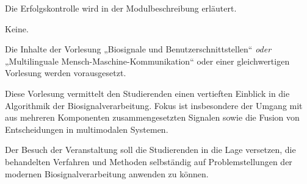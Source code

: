 \begin{course}

\setdoclanguagegerman
{}



\coursehead


\label{cour_13729.dp_997}


\begin{styleenv}
\begin{assessment}
Die Erfolgskontrolle wird in der Modulbeschreibung erläutert.


\end{assessment}

\begin{conditions}Keine.\end{conditions}

\begin{recommendations}Die Inhalte der Vorlesung „Biosignale und Benutzerschnittstellen“ \emph{oder} „Multilinguale Mensch-Maschine-Kommunikation“ oder einer gleichwertigen Vorlesung werden vorausgesetzt.

\end{recommendations}
\end{styleenv}

\begin{learningoutcomes}
Diese Vorlesung vermittelt den Studierenden einen vertieften Einblick in die Algorithmik der Biosignalverarbeitung. Fokus ist insbesondere der Umgang mit aus mehreren Komponenten zusammengesetzten Signalen sowie die Fusion von Entscheidungen in multimodalen Systemen.

 

Der Besuch der Veranstaltung soll die Studierenden in die Lage versetzen, die behandelten Verfahren und Methoden selbständig auf Problemstellungen der modernen Biosignalverarbeitung anwenden zu können.



\end{learningoutcomes}
\end{course}
